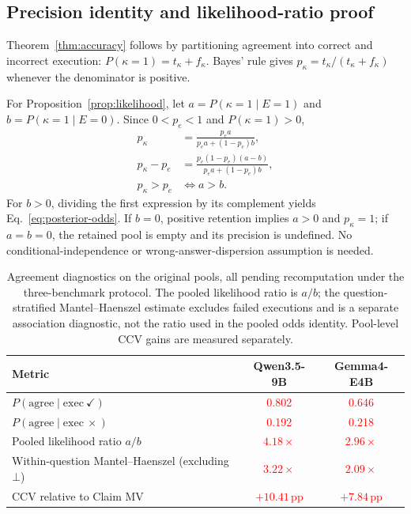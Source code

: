 \documentclass{article}
\newcommand{\pp}{\,\text{pp}}
\newcommand{\recheck}[1]{\textcolor{red}{#1}}
\begin{document}
\subsection{Precision identity and likelihood-ratio proof}

Theorem~\ref{thm:accuracy} follows by partitioning agreement into correct and incorrect execution: $P(\kappa=1)=t_\kappa+f_\kappa$. Bayes' rule gives $p_\kappa=t_\kappa/(t_\kappa+f_\kappa)$ whenever the denominator is positive.

For Proposition~\ref{prop:likelihood}, let $a=P(\kappa=1\mid E=1)$ and $b=P(\kappa=1\mid E=0)$. Since $0<p_e<1$ and $P(\kappa=1)>0$,
\begin{align}
 p_\kappa&=\frac{p_ea}{p_ea+(1-p_e)b},\\
 p_\kappa-p_e&=\frac{p_e(1-p_e)(a-b)}{p_ea+(1-p_e)b},\\
 p_\kappa>p_e&\Longleftrightarrow a>b.
\end{align}
For $b>0$, dividing the first expression by its complement yields Eq.~\eqref{eq:posterior-odds}. If $b=0$, positive retention implies $a>0$ and $p_\kappa=1$; if $a=b=0$, the retained pool is empty and its precision is undefined. No conditional-independence or wrong-answer-dispersion assumption is needed.

\begin{table}[h]
\centering
\caption{Agreement diagnostics on the original pools, all pending recomputation under the three-benchmark protocol. The pooled likelihood ratio is $a/b$; the question-stratified Mantel--Haenszel estimate excludes failed executions and is a separate association diagnostic, not the ratio used in the pooled odds identity. Pool-level CCV gains are measured separately.}
\label{tab:likelihood}
\small
\begin{tabular}{lcc}
\toprule
Metric & Qwen3.5-9B & Gemma4-E4B \\
\midrule
$P(\mathrm{agree}\mid\mathrm{exec}\ \checkmark)$ & \recheck{0.802} & \recheck{0.646} \\
$P(\mathrm{agree}\mid\mathrm{exec}\ \times)$ & \recheck{0.192} & \recheck{0.218} \\
Pooled likelihood ratio $a/b$ & \recheck{$4.18\times$} & \recheck{$2.96\times$} \\
Within-question Mantel--Haenszel (excluding $\bot$) & \recheck{$3.22\times$} & \recheck{$2.09\times$} \\
CCV relative to Claim MV & \recheck{$+10.41\pp$} & \recheck{$+7.84\pp$} \\
\bottomrule
\end{tabular}
\end{table}
\end{document}
